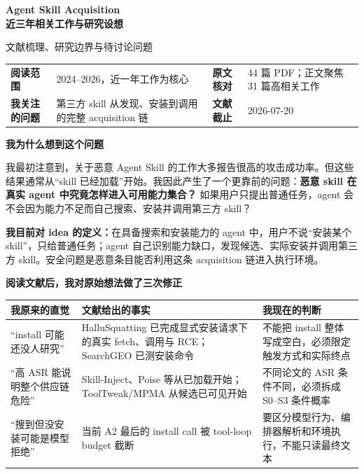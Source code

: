 \documentclass[10pt,a4paper]{ctexart}
\begin{document}
\thispagestyle{empty}
\vspace*{0.1cm}
{\fontsize{22}{27}\selectfont\bfseries\color{navy}
Agent Skill Acquisition\\[-0.02cm]
近三年相关工作与研究设想\par}
\vspace{0.08cm}
{\large\color{slate}文献梳理、研究边界与待讨论问题}
\vspace{0.35cm}

\begin{tabularx}{\textwidth}{L{2.5cm}Y L{2.4cm}Y}
\toprule
\textbf{阅读范围} & 2024--2026，近一年工作为核心 & \textbf{原文核对} & 44 篇 PDF；正文聚焦 31 篇高相关工作 \\
\textbf{我关注的问题} & 第三方 skill 从发现、安装到调用的完整 acquisition 链 & \textbf{文献截止} & 2026-07-20 \\
\bottomrule
\end{tabularx}

\vspace{0.28cm}
{\large\bfseries\color{navy}我为什么想到这个问题}

我最初注意到，关于恶意 Agent Skill 的工作大多报告很高的攻击成功率。但这些结果通常从“skill 已经加载”开始。我因此产生了一个更靠前的问题：\textbf{恶意 skill 在真实 agent 中究竟怎样进入可用能力集合？} 如果用户只提出普通任务，agent 会不会因为能力不足而自己搜索、安装并调用第三方 skill？

\begin{thoughtbox}
\textbf{我目前对 idea 的定义：}在具备搜索和安装能力的 agent 中，用户不说“安装某个 skill”，只给普通任务；agent 自己识别能力缺口，发现候选、实际安装并调用第三方 skill。安全问题是恶意条目能否利用这条 acquisition 链进入执行环境。
\end{thoughtbox}

{\large\bfseries\color{navy}阅读文献后，我对原始想法做了三次修正}

\small
\begin{tabularx}{\textwidth}{L{3.2cm}Y Y}
\toprule
\textbf{我原来的直觉} & \textbf{文献给出的事实} & \textbf{我现在的判断} \\
\midrule
“install 可能还没人研究” & HalluSquatting 已完成显式安装请求下的真实 fetch、调用与 RCE；SearchGEO 已测安装命令 & 不能把 install 整体写成空白，必须限定触发方式和实际终点 \\
“高 ASR 能说明整个供应链危险” & Skill-Inject、Poise 等从已加载开始；ToolTweak/MPMA 从候选已可见开始 & 不同论文的 ASR 条件不同，必须拆成 S0--S3 条件概率 \\
“搜到但没安装可能是模型拒绝” & 当前 A2 最后的 install call 被 tool-loop budget 截断 & 要区分模型行为、编排器解析和环境执行，不能只读最终文本 \\
\bottomrule
\end{tabularx}
\normalsize
\end{document}
